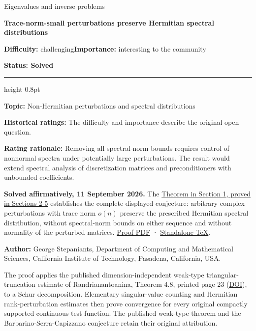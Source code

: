 \documentclass[11pt,a4paper]{article}
\makeatletter
\renewcommand{\subsection}{\Needspace{4\baselineskip}\@startsection{subsection}{2}{0pt}{9pt plus 1pt minus 1pt}{3pt}{\sffamily\bfseries\normalsize\color{ink}}}
\makeatother
\begin{document}
{\sffamily\small\color{muted}Eigenvalues and inverse problems\par}
\vspace{3pt}
{\raggedright{}\sffamily\bfseries\fontsize{21}{24}\selectfont\color{ink}Trace-norm-small
perturbations preserve Hermitian spectral distributions\par}
\vspace{7pt}
{\sffamily\small\textbf{Difficulty:} challenging\quad\textbf{Importance:} interesting
to the community\par}
{\sffamily\small\bfseries\color{accent}Status: Solved\par}
\vspace{4pt}
{\color{accent}\hrule height 0.8pt}
\vspace{6pt}
\textbf{Topic:} Non-Hermitian perturbations and spectral distributions

\textbf{Historical ratings:} The difficulty and importance describe the
original open question.

\textbf{Rating rationale:} Removing all spectral-norm bounds requires
control of nonnormal spectra under potentially large perturbations. The
result would extend spectral analysis of discretization matrices and
preconditioners with unbounded coefficients.

\subsection{Resolution}\label{resolution}

\textbf{Solved affirmatively, 11 September 2026.} The
\href{https://github.com/ajt60gaibb/OpenProblemsInNLA/blob/main/eigenvalues-and-inverse-problems/SP-13/solution.md}{Theorem
in Section 1, proved in Sections 2-5} establishes the complete displayed
conjecture: arbitrary complex perturbations with trace norm \(o(n)\)
preserve the prescribed Hermitian spectral distribution, without
spectral-norm bounds on either sequence and without normality of the
perturbed matrices.
\href{https://github.com/ajt60gaibb/OpenProblemsInNLA/blob/main/eigenvalues-and-inverse-problems/SP-13/solution.pdf}{Proof
PDF} ·
\href{https://github.com/ajt60gaibb/OpenProblemsInNLA/blob/main/eigenvalues-and-inverse-problems/SP-13/solution.tex}{Standalone
TeX}.

\textbf{Author:} George Stepaniants, Department of Computing and
Mathematical Sciences, California Institute of Technology, Pasadena,
California, USA.

The proof applies the published dimension-independent weak-type
triangular-truncation estimate of Randrianantoanina, Theorem 4.8,
printed page 23 (\href{https://doi.org/10.4064/cm91-1-2}{DOI}), to a
Schur decomposition. Elementary singular-value counting and Hermitian
rank-perturbation estimates then prove convergence for every original
compactly supported continuous test function. The published weak-type
theorem and the Barbarino-Serra-Capizzano conjecture retain their
original attribution.
\end{document}
